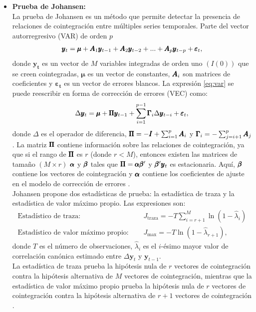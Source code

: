 \documentclass[12pt]{article}
\begin{document}
\begin{itemize}
    \item \textbf{Prueba de Johansen:}\\
    La prueba de Johansen es un método que permite detectar la presencia de relaciones de cointegración entre múltiples series temporales.
    Parte del vector autorregresivo (VAR) de orden $p$ 
    \begin{align}
        \pmb{y}_t = \pmb{\mu} + \pmb{A}_1 \pmb{y}_{t-1} + \pmb{A}_2 \pmb{y}_{t-2} + ... + \pmb{A}_p \pmb{y}_{t-p} + \pmb{\varepsilon}_t,
        \label{eq:var}
    \end{align}
    donde $\pmb{y_t}$ es un vector de $M$ variables integradas de orden uno $(I(0))$ que se creen cointegradas,
    $\pmb{\mu}$ es un vector de constantes, $\pmb{A}_i$ son matrices de coeficientes y 
    $\pmb{\varepsilon_t}$ es un vector de errores blancos. La expresión \eqref{eq:var} se puede reescribir 
    en forma de corrección de errores (VEC) como:
    \begin{align}
        \Delta \pmb{y}_t = \pmb{\mu} + \pmb{\Pi} \pmb{y}_{t-1}+ \sum_{i=1}^{p-1} \pmb{\Gamma}_i \Delta \pmb{y}_{t-i} + \pmb{\varepsilon}_t,
    \end{align}
    donde $\Delta$ es el operador de diferencia, $\pmb{\Pi} = -\pmb{I} + \sum_{i=1}^{p} \pmb{A}_i$ y
    $\pmb{\Gamma}_i = -\sum_{j=i+1}^{p} \pmb{A}_j$. La matriz $\pmb{\Pi}$ contiene información sobre las relaciones de cointegración, ya que
    si el rango de $\pmb{\Pi}$ es $r$ (donde $r < M$), entonces existen las matrices  de tamaño $(M \times r)$ $\pmb{\alpha}$ y $\pmb{\beta}$ 
    tales que $\pmb{\Pi} = \pmb{\alpha} \pmb{\beta}'$ y $\pmb{\beta}' \pmb{y}_t$ es estacionaria. Aquí, $\pmb{\beta}$ contiene los vectores de cointegración y $\pmb{\alpha}$ 
    contiene los coeficientes de ajuste en el modelo de corrección de errores \cite{Osterholm2007Testing}.\\
    Johansen propone dos estadísticas de prueba: la estadística de traza y la estadística de valor máximo propio. Las expresiones son:
    \begin{align}
        \text{Estadístico de traza: } & \quad J_{\text{traza}} = -T \sum_{i=r+1}^{M} \ln(1 - \hat{\lambda}_i) \\
        \text{Estadístico de valor máximo propio: } & \quad J_{\text{max}} = -T \ln(1 - \hat{\lambda}_{r+1}),
    \end{align}
    donde $T$ es el número de observaciones, $\hat{\lambda}_i$ es el $i$-ésimo mayor valor de correlación canónica estimado entre $\Delta \pmb{y}_t$ y $\pmb{y}_{t-1}$.\\
    La estadística de traza prueba la hipótesis nula de $r$ vectores de cointegración contra 
    la hipótesis alternativa de $M$ vectores de cointegración, mientras que la estadística de valor máximo propio prueba la hipótesis nula de $r$ vectores de cointegración
    contra la hipótesis alternativa de $r+1$ vectores de cointegración \cite{Osterholm2007Testing}.


\end{itemize}
\end{document}
